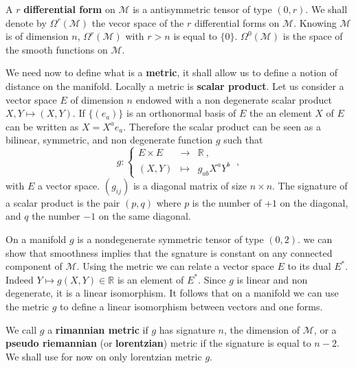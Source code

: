 \documentclass[10pt]{book}
\newcommand{\Mcal}{\mathcal{M}}
\newcommand{\Rbb}{\mathbb{R}}
\theoremstyle{break}
\begin{document}
\bigskip


A $r$ \textbf{differential form} on $\Mcal$ is a antisymmetric tensor of type $(0,r)$. We shall denote by $\Omega^r(\Mcal)$ the vecor space of the $r$ differential forms on $\Mcal$. Knowing $\Mcal$ is of dimension $n$, $\Omega^r(\Mcal)$ with $r>n$ is equal to $\{0\}$. $\Omega^0(\Mcal)$ is the space of the smooth functions on $\Mcal$.


\bigskip


We need now to define what is a \textbf{metric}, it shall allow us to define a notion of distance on the manifold. Locally a metric is \textbf{scalar product}. Let us consider a vector space $E$ of dimension $n$ endowed with a non degenerate scalar product $X,Y \mapsto (X,Y)$. If $\{(e_a)\}$ is an orthonormal basis of $E$ the an element $X$ of $E$ can be written as $X = X^a e_a$. Therefore the scalar product can be seen as a bilinear, symmetric, and non degenerate function $g$ such that
%
\begin{equation*}
g : \left\{ 
\begin{array}{lcl}
E \times E & \to & \Rbb \ , \\
(X,Y) & \mapsto & g_{ab} X^a Y^b
\end{array}
\right. \ ,
\end{equation*}
%
with $E$ a vector space. $(g_{ij})$ is a diagonal matrix of size $n \times n$. The signature of a scalar product is the pair $(p,q)$ where $p$ is the number of $+1$ on the diagonal, and $q$ the number $-1$ on the same diagonal. 


\bigskip


On a manifold $g$ is a nondegenerate symmetric tensor of type $(0,2)$. we can show that smoothness implies that the sgnature is constant on any connected component of $\Mcal$. Using the metric we can relate a vector space $E$ to its dual $E^\ast$. Indeed $Y \mapsto g(X,Y) \in \Rbb$ is an element of $E^\ast$. Since $g$ is linear and non degenerate, it is a linear isomorphism. It follows that on a manifold we can use the metric $g$ to define a linear isomorphism between vectors and one forms. 


\bigskip


We call $g$ a \textbf{rimannian metric} if $g$ has signature $n$, the dimension of $\Mcal$, or a \textbf{pseudo riemannian} (or \textbf{lorentzian}) metric if the signature is equal to $n-2$. We shall use for now on only lorentzian metric $g$.
\end{document}
